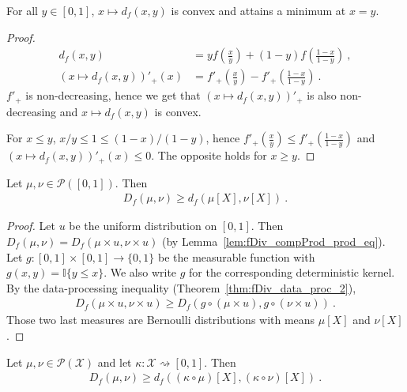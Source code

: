 \begin{lemma}
  \label{lem:fDiv_bernoulli_convex}
  For all $y \in [0,1]$, $x \mapsto d_f(x, y)$ is convex and attains a minimum at $x = y$.
\end{lemma}

\begin{proof}%
\uses{}

\begin{align*}
d_f(x, y)
&= y f(\frac{x}{y}) + (1 - y) f(\frac{1 - x}{1 - y})
\: , \\
(x \mapsto d_f(x, y))'_+(x)
&= f'_+(\frac{x}{y}) - f'_+(\frac{1 - x}{1 - y})
\: .
\end{align*}
$f'_+$ is non-decreasing, hence we get that $(x \mapsto d_f(x, y))'_+$ is also non-decreasing and $x \mapsto d_f(x, y)$ is convex.

For $x \le y$, $x/y \le 1 \le (1-x)/(1-y)$, hence $f'_+(\frac{x}{y}) \le f'_+(\frac{1 - x}{1 - y})$ and $(x \mapsto d_f(x, y))'_+(x) \le 0$. The opposite holds for $x \ge y$.

\end{proof}


\begin{lemma}
  \label{lem:fDiv_bounded_ge_fDiv_mean}
  Let $\mu, \nu \in \mathcal P([0,1])$. Then
  \begin{align*}
  D_f(\mu, \nu) \ge d_f(\mu[X], \nu[X]) \: .
  \end{align*}
\end{lemma}

\begin{proof}%
{}
Let $u$ be the uniform distribution on $[0,1]$. Then $D_f(\mu, \nu) = D_f(\mu \times u, \nu \times u)$ (by Lemma~\ref{lem:fDiv_compProd_prod_eq}).
Let $g : [0,1] \times [0,1] \to \{0,1\}$ be the measurable function with $g(x, y) = \mathbb{I}\{y \le x\}$. We also write $g$ for the corresponding deterministic kernel. By the data-processing inequality (Theorem~\ref{thm:fDiv_data_proc_2}),
\begin{align*}
D_f(\mu \times u, \nu \times u)
\ge D_f(g \circ (\mu \times u), g \circ (\nu \times u))
\: .
\end{align*}
Those two last measures are Bernoulli distributions with means $\mu[X]$ and $\nu[X]$.
\end{proof}


\begin{corollary}
  \label{cor:fDiv_ge_fDiv_mean_comp}
  Let $\mu, \nu \in \mathcal P(\mathcal X)$ and let $\kappa : \mathcal X \rightsquigarrow [0,1]$. Then
  \begin{align*}
  D_f(\mu, \nu) \ge d_f((\kappa \circ \mu)[X], (\kappa \circ \nu)[X]) \: .
  \end{align*}
\end{corollary}

